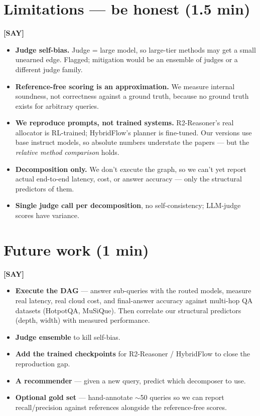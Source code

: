 \documentclass[11pt]{article}
\newcommand{\say}{\textcolor{sayc}{\textbf{[SAY]}}\ }
\begin{document}
\section{Limitations --- be honest (1.5 min)}

\say
\begin{itemize}
  \item \textbf{Judge self-bias.} Judge = large model, so large-tier methods may
  get a small unearned edge. Flagged; mitigation would be an ensemble of judges or
  a different judge family.
  \item \textbf{Reference-free scoring is an approximation.} We measure internal
  soundness, not correctness against a ground truth, because no ground truth
  exists for arbitrary queries.
  \item \textbf{We reproduce prompts, not trained systems.} R2-Reasoner's real
  allocator is RL-trained; HybridFlow's planner is fine-tuned. Our versions use
  base instruct models, so absolute numbers understate the papers --- but the
  \emph{relative method comparison} holds.
  \item \textbf{Decomposition only.} We don't execute the graph, so we can't yet
  report actual end-to-end latency, cost, or answer accuracy --- only the
  structural predictors of them.
  \item \textbf{Single judge call per decomposition}, no self-consistency;
  LLM-judge scores have variance.
\end{itemize}

\section{Future work (1 min)}

\say
\begin{itemize}
  \item \textbf{Execute the DAG} --- answer sub-queries with the routed models,
  measure real latency, real cloud cost, and final-answer accuracy against
  multi-hop QA datasets (HotpotQA, MuSiQue). Then correlate our structural
  predictors (depth, width) with measured performance.
  \item \textbf{Judge ensemble} to kill self-bias.
  \item \textbf{Add the trained checkpoints} for R2-Reasoner / HybridFlow to close
  the reproduction gap.
  \item \textbf{A recommender} --- given a new query, predict which decomposer to
  use.
  \item \textbf{Optional gold set} --- hand-annotate $\sim$50 queries so we can
  report recall/precision against references alongside the reference-free scores.
\end{itemize}
\end{document}

